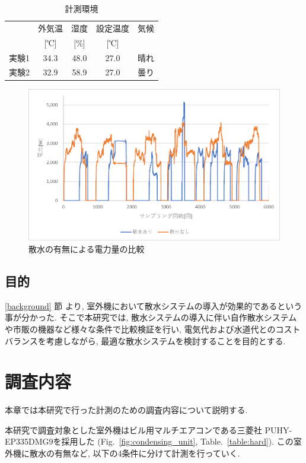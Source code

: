 \documentclass[a4j,fleqn,dvipdfmx,uplatex]{jsarticle}
\newcommand{\figref}[1]{Fig.\ \ref{#1}}
\newcommand{\tableref}[1]{Table.\ \ref{#1}}
\newcommand{\subsecref}[1]{\ref{#1}\hspace{0.2zw} 節}
\begin{document}
\begin{table}[htb]
  \caption{計測環境}
  \label{table:ex1}
  \centering
  \begin{tabular}{lcccc}
     & 外気温 & 湿度 & 設定温度 & 気候 \\[-1.5mm]
     & [℃] & [\%] & [℃] &  \\
    \hline \hline
    実験1 & 34.3 & 48.0 & 27.0 & 晴れ  \\
    実験2 & 32.9 & 58.9 & 27.0 & 曇り \\
    \hline
  \end{tabular}
\end{table}

\begin{figure}[htb]
  \centering
      \includegraphics[width=0.8\linewidth]{img/ex1.png}
      \caption{散水の有無による電力量の比較}
      \label{fig1:compare_watering}
\end{figure}


\subsection{目的}\label{purpose}
\subsecref{background} より, 室外機において散水システムの導入が効果的であるという事が分かった. 
そこで本研究では, 散水システムの導入に伴い自作散水システムや市販の機器など様々な条件で比較検証を行い, 
電気代および水道代とのコストバランスを考慮しながら, 最適な散水システムを検討することを目的とする. 

\section{調査内容}\label{sec2}
本章では本研究で行った計測のための調査内容について説明する. 

本研究で調査対象とした室外機はビル用マルチエアコンである三菱社 
PUHY-EP335DMG9を採用した (\figref{fig:condensing_unit}, \tableref{table:hard}). 
この室外機に散水の有無など, 以下の4条件に分けて計測を行っていく.  
\end{document}
